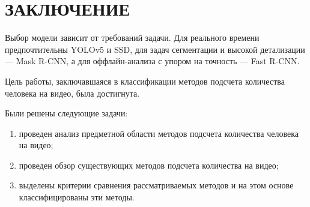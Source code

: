 \chapter*{ЗАКЛЮЧЕНИЕ}

Выбор модели зависит от требований задачи. Для реального времени предпочтительны YOLOv5 и SSD, для задач сегментации и высокой детализации --- Mask R-CNN, а для оффлайн-анализа с упором на точность --- Fast R-CNN.

Цель работы, заключавшаяся в классификации методов подсчета количества человека на видео, была достигнута.

Были решены следующие задачи:
\begin{enumerate}[leftmargin=1.6\parindent]
	\item проведен анализ предметной области методов подсчета количества человека на видео;
	\item проведен обзор существующих методов подсчета количества на видео;
	\item выделены критерии сравнения рассматриваемых методов и на этом основе классифицированы эти методы.
\end{enumerate}